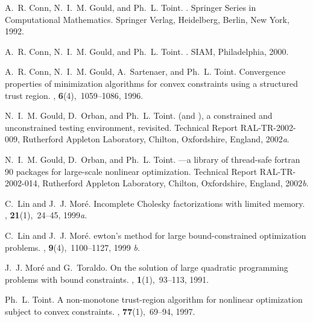 \documentclass[11pt,twoside]{article}
\begin{document}
\newpage

%
%

\begin{thebibliography}{xx}

A.~R. Conn, N.~I.~M. Gould, and Ph.~L. Toint.
.
\newblock Springer Series in Computational Mathematics. Springer Verlag,
  Heidelberg, Berlin, New York, 1992.

A.~R. Conn, N.~I.~M. Gould, and Ph.~L. Toint.
.
\newblock SIAM, Philadelphia, 2000.

A.~R. Conn, N.~I.~M. Gould, A.~Sartenaer, and Ph.~L. Toint.
\newblock Convergence properties of minimization algorithms for convex
  constraints using a structured trust region.
, {\bf 6}(4),~1059--1086, 1996.

N.~I.~M. Gould, D.~Orban, and Ph.~L. Toint.
 (and \rm), a constrained and unconstrained
  testing environment, revisited.
\newblock Technical Report RAL-TR-2002-009, Rutherford Appleton Laboratory,
  Chilton, Oxfordshire, England, 2002{\em a}.

N.~I.~M. Gould, D.~Orban, and Ph.~L. Toint.
---a library of thread-safe fortran 90 packages for
  large-scale nonlinear optimization.
\newblock Technical Report RAL-TR-2002-014, Rutherford Appleton Laboratory,
  Chilton, Oxfordshire, England, 2002{\em b}.

C.~Lin and J.~J. Mor\'{e}.
\newblock Incomplete {C}holesky factorizations with limited memory.
, {\bf 21}(1),~24--45,
  1999{\em a}.

C.~Lin and J.~J. Mor\'{e}.
ewton's method for large bound-constrained optimization problems.
, {\bf 9}(4),~1100--1127, 1999{\em
  b}.

J.~J. Mor\'{e} and G.~Toraldo.
\newblock On the solution of large quadratic programming problems with bound
  constraints.
, {\bf 1}(1),~93--113, 1991.

Ph.~L. Toint.
\newblock A non-monotone trust-region algorithm for nonlinear optimization
  subject to convex constraints.
, {\bf 77}(1),~69--94, 1997.

\end{thebibliography}
\end{document}
